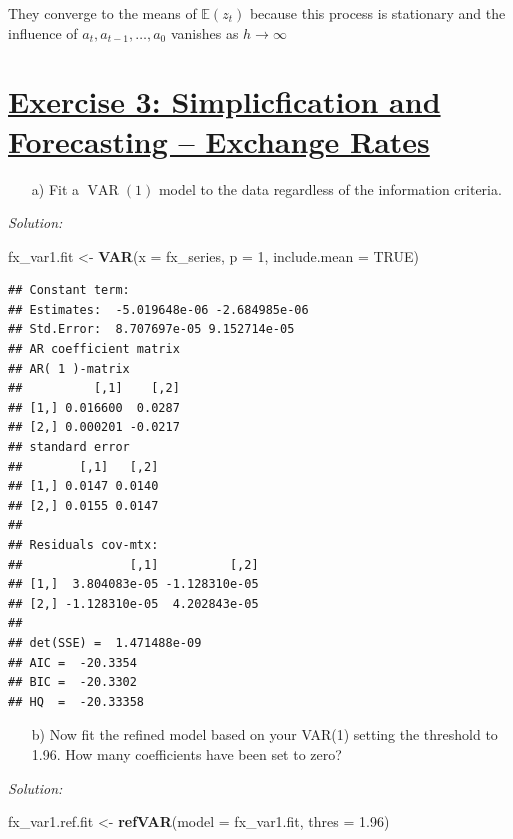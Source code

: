 \documentclass[12pt,a4paper]{article}
\newcommand{\VAR}{\operatorname{VAR}} %
\newcommand{\tmpsection}[1]{}
\let\tmpsection=\section
\renewcommand{\section}[1]{\tmpsection{\underline{#1}} }
\newenvironment{Shaded}{\begin{snugshade}}{\end{snugshade}}
\newcommand{\DataTypeTok}[1]{\textcolor[rgb]{0.13,0.29,0.53}{#1}}
\newcommand{\DecValTok}[1]{\textcolor[rgb]{0.00,0.00,0.81}{#1}}
\newcommand{\FloatTok}[1]{\textcolor[rgb]{0.00,0.00,0.81}{#1}}
\newcommand{\KeywordTok}[1]{\textcolor[rgb]{0.13,0.29,0.53}{\textbf{#1}}}
\newcommand{\NormalTok}[1]{#1}
\newcommand{\OtherTok}[1]{\textcolor[rgb]{0.56,0.35,0.01}{#1}}
\newcommand{\StringTok}[1]{\textcolor[rgb]{0.31,0.60,0.02}{#1}}
\begin{document}
They converge to the means of \(\mathbb{E}(z_t)\) because this process
is stationary and the influence of \(a_t, a_{t-1}, \ldots, a_{0}\)
vanishes as \(h \rightarrow \infty\)

\hypertarget{exercise-3-simplicfication-and-forecasting-exchange-rates}{%
\section{Exercise 3: Simplicfication and Forecasting -- Exchange
Rates}\label{exercise-3-simplicfication-and-forecasting-exchange-rates}}

\begin{itemize}
  \item[a)] Fit a $\VAR(1)$ model to the data regardless of the information criteria.
\end{itemize}

\emph{Solution:}

\begin{Shaded}
\begin{Highlighting}[]
\NormalTok{fx_var1.fit <-}\StringTok{ }\KeywordTok{VAR}\NormalTok{(}\DataTypeTok{x =}\NormalTok{ fx_series, }\DataTypeTok{p =} \DecValTok{1}\NormalTok{, }\DataTypeTok{include.mean =} \OtherTok{TRUE}\NormalTok{)}
\end{Highlighting}
\end{Shaded}

\begin{verbatim}
## Constant term: 
## Estimates:  -5.019648e-06 -2.684985e-06 
## Std.Error:  8.707697e-05 9.152714e-05 
## AR coefficient matrix 
## AR( 1 )-matrix 
##          [,1]    [,2]
## [1,] 0.016600  0.0287
## [2,] 0.000201 -0.0217
## standard error 
##        [,1]   [,2]
## [1,] 0.0147 0.0140
## [2,] 0.0155 0.0147
##   
## Residuals cov-mtx: 
##               [,1]          [,2]
## [1,]  3.804083e-05 -1.128310e-05
## [2,] -1.128310e-05  4.202843e-05
##   
## det(SSE) =  1.471488e-09 
## AIC =  -20.3354 
## BIC =  -20.3302 
## HQ  =  -20.33358
\end{verbatim}

\begin{itemize}
  \item[b)] Now fit the refined model based on your VAR(1) setting the threshold to 1.96. How many coefficients have been set to zero?
\end{itemize}

\emph{Solution:}

\begin{Shaded}
\begin{Highlighting}[]
\NormalTok{fx_var1.ref.fit <-}\StringTok{ }\KeywordTok{refVAR}\NormalTok{(}\DataTypeTok{model =}\NormalTok{ fx_var1.fit, }\DataTypeTok{thres =} \FloatTok{1.96}\NormalTok{)}
\end{Highlighting}
\end{Shaded}
\end{document}
